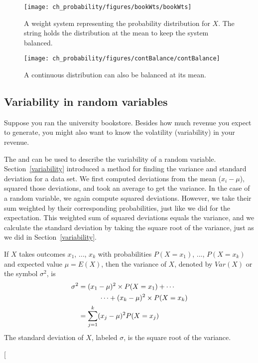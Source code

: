 \begin{figure}
\centering
\texttt{[image: ch\_probability/figures/bookWts/bookWts]}
\caption{A weight system representing the probability distribution for $X$. The string holds the distribution at the mean to keep the system balanced.}
\label{bookWts}
\end{figure}

\begin{figure}
\centering
\texttt{[image: ch\_probability/figures/contBalance/contBalance]}
\caption{A continuous distribution can also be balanced at its mean.}
\label{contBalance}
\end{figure}



\subsection{Variability in random variables}

Suppose you ran the university bookstore. Besides how much revenue you expect to generate, you might also want to know the volatility (variability) in your revenue. 

The  and  can be used to describe the variability of a random variable. Section~\ref{variability}
introduced a method for finding the variance and standard deviation for a data set. We first computed deviations from the mean ($x_i - \mu$), squared those deviations, and took an average to get the variance. In the case of a random variable, we again compute squared deviations. However, we take their sum weighted by their corresponding probabilities, just like we did for the expectation. This weighted sum of squared deviations equals the variance, and we calculate the standard deviation by taking the square root of the variance, just as we did in Section~\ref{variability}.

\begin{termBox}{
If $X$ takes outcomes $x_1$, ..., $x_k$ with probabilities $P(X=x_1)$, ..., $P(X=x_k)$ and expected value $\mu=E(X)$, then the variance of $X$, denoted by $Var(X)$ or the symbol $\sigma^2$, is
\begin{align}
\sigma^2 &= (x_1-\mu)^2\times P(X=x_1) + \cdots \notag \\
	& \qquad\quad\cdots+ (x_k-\mu)^2\times P(X=x_k) \notag \\
	&= \sum_{j=1}^{k} (x_j - \mu)^2 P(X=x_j)
\end{align}
The standard deviation of $X$, labeled $\sigma$, is the square root of the variance.}
\end{termBox}
\marginpar[\raggedright\vspace{-47mm}

